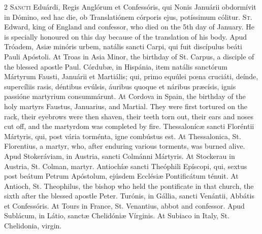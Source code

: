 \begin{paracol}{2}
\lettrine[lines=2]{S}{ancti} Eduárdi, Regis 
 Anglórum et Confessóris, qui Nonis Januárii obdormívit in Dómino, sed hac 
 die, ob Translatiónem córporis ejus, potíssimum cólitur.
\switchcolumn
{}
\lettrine[lines=2]{S}{t.} Edward, king of England and 
 confessor, who died on the 5th day of January. He is specially 
 honoured on this day because of the translation of his body.
\switchcolumn*
{}
Apud Tróadem, Asiæ 
 minóris urbem, natális sancti Carpi, qui fuit discípulus beáti Pauli 
 Apóstoli.
\switchcolumn
{}
At Troas in Asia Minor, the birthday 
 of St. Carpus, a disciple of the blessed apostle Paul.
\switchcolumn*
{}
Córdubæ, in Hispánia, 
 item natális sanctórum Mártyrum Fausti, Januárii et Martiális; qui, primo 
 equúlei pœna cruciáti, deínde, supercíliis rasis, déntibus evúlsis, áuribus 
 quoque et náribus præcísis, ignis passióne martyrium consummárunt.
\switchcolumn
{}
At Cordova in Spain, the birthday of 
 the holy martyrs Faustus, Januarius, and Martial. They were first 
 tortured on the rack, their eyebrows were then shaven, their teeth torn out, 
 their ears and noses cut off, and the martyrdom was completed by fire.
\switchcolumn*
{}
Thessalonícæ sancti 
 Floréntii Mártyris, qui, post vária torménta, igne combústus est.
\switchcolumn
{}
At Thessalonica, St. Florentius, a 
 martyr, who, after enduring various torments, was burned alive.
\switchcolumn*
{}
Apud Stokeráviam, in 
 Austria, sancti Colmánni Mártyris.
\switchcolumn
{}
At Stockerau in Austria, St. Colman, 
 martyr.
\switchcolumn*
{}
Antiochíæ sancti 
 Theóphili Epíscopi, qui, sextus post beátum Petrum Apóstolum, ejúsdem 
 Ecclésiæ Pontificátum ténuit.
\switchcolumn
{}
At Antioch, St. Theophilus, the 
 bishop who held the pontificate in that church, the sixth after the blessed 
 apostle Peter.
\switchcolumn*
{}
Turónis, in Gállia, 
 sancti Venántii, Abbátis et Confessóris.
\switchcolumn
{}
At Tours in France, St. Venantius, 
 abbot and confessor.
\switchcolumn*
{}
Apud Sublácum, in Látio, 
 sanctæ Chelidóniæ Vírginis.
\switchcolumn
{}
At Subiaco in Italy, St. Chelidonia, 
 virgin.
\switchcolumn*
{}
\end{paracol}



